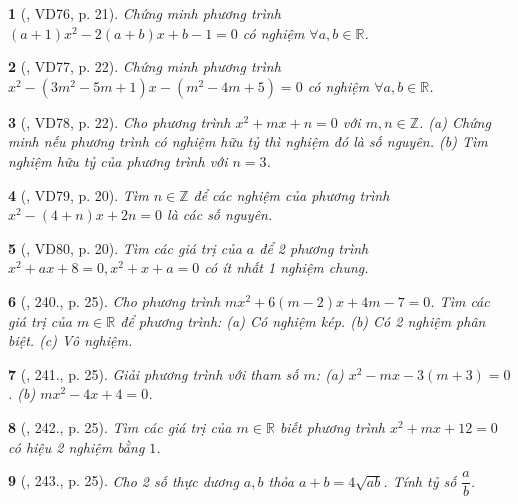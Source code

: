 \documentclass{article}
\newtheorem{baitoan}{}
\begin{document}
\begin{baitoan}[\cite{Binh_Toan_9_tap_2}, VD76, p. 21]
	Chứng minh phương trình $(a + 1)x^2 - 2(a + b)x + b - 1 = 0$ có nghiệm $\forall a,b\in\mathbb{R}$.
\end{baitoan}

\begin{baitoan}[\cite{Binh_Toan_9_tap_2}, VD77, p. 22]
	Chứng minh phương trình $x^2 - (3m^2 - 5m + 1)x - (m^2 - 4m + 5) = 0$ có nghiệm $\forall a,b\in\mathbb{R}$.
\end{baitoan}

\begin{baitoan}[\cite{Binh_Toan_9_tap_2}, VD78, p. 22]
	Cho phương trình $x^2 + mx + n = 0$ với $m,n\in\mathbb{Z}$. (a) Chứng minh nếu phương trình có nghiệm hữu tỷ thì nghiệm đó là số nguyên. (b) Tìm nghiệm hữu tỷ của phương trình với $n = 3$.
\end{baitoan}

\begin{baitoan}[\cite{Binh_Toan_9_tap_2}, VD79, p. 20]
	Tìm $n\in\mathbb{Z}$ để các nghiệm của phương trình $x^2 - (4 + n)x + 2n = 0$ là các số nguyên.
\end{baitoan}

\begin{baitoan}[\cite{Binh_Toan_9_tap_2}, VD80, p. 20]
	Tìm các giá trị của $a$ để 2 phương trình $x^2 + ax + 8 = 0,x^2 + x + a = 0$ có ít nhất 1 nghiệm chung.
\end{baitoan}

\begin{baitoan}[\cite{Binh_Toan_9_tap_2}, 240., p. 25]
	Cho phương trình $mx^2 + 6(m - 2)x + 4m - 7 = 0$. Tìm các giá trị của $m\in\mathbb{R}$ để phương trình: (a) Có nghiệm kép. (b) Có 2 nghiệm phân biệt. (c) Vô nghiệm.
\end{baitoan}

\begin{baitoan}[\cite{Binh_Toan_9_tap_2}, 241., p. 25]
	Giải phương trình với tham số $m$: (a) $x^2 - mx - 3(m + 3) = 0$. (b) $mx^2 - 4x + 4 = 0$.
\end{baitoan}

\begin{baitoan}[\cite{Binh_Toan_9_tap_2}, 242., p. 25]
	Tìm các giá trị của $m\in\mathbb{R}$ biết phương trình $x^2 + mx + 12 = 0$ có hiệu 2 nghiệm bằng $1$.
\end{baitoan}

\begin{baitoan}[\cite{Binh_Toan_9_tap_2}, 243., p. 25]
	Cho 2 số thực dương $a,b$ thỏa $a + b = 4\sqrt{ab}$. Tính tỷ số $\dfrac{a}{b}$.
\end{baitoan}
\end{document}
